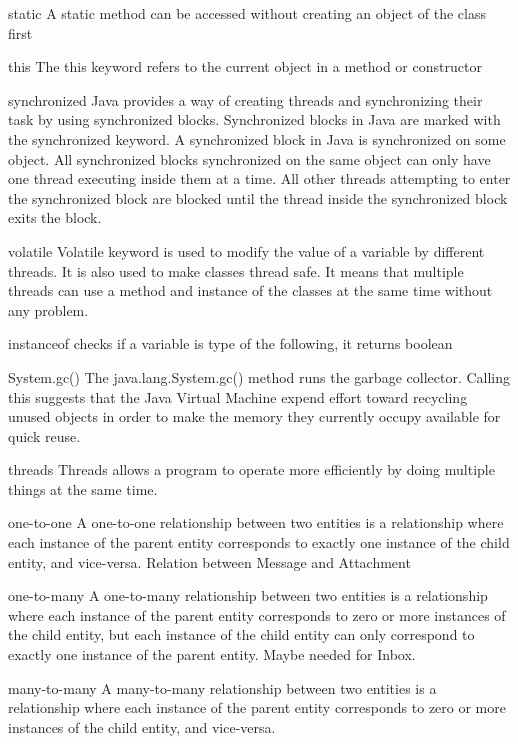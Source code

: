 \documentclass[a4paper,12pt]{article}
\begin{document}
static
A static method can be accessed without creating an object of the class first

this
The this keyword refers to the current object in a method or constructor

synchronized
Java provides a way of creating threads and synchronizing their task by using synchronized blocks. Synchronized blocks in Java are marked with the synchronized keyword. 
A synchronized block in Java is synchronized on some object. 
All synchronized blocks synchronized on the same object can only have one thread executing inside them at a time.
All other threads attempting to enter the synchronized block are blocked until the thread inside the synchronized block exits the block.

volatile
Volatile keyword is used to modify the value of a variable by different threads. It is also used to make classes thread safe. 
It means that multiple threads can use a method and instance of the classes at the same time without any problem.

instanceof
checks if a variable is type of the following, it returns boolean

System.gc()
The java.lang.System.gc() method runs the garbage collector. 
Calling this suggests that the Java Virtual Machine expend effort 
toward recycling unused objects in order to make the memory they currently occupy available for quick reuse.

threads
Threads allows a program to operate more efficiently by doing multiple things at the same time.

one-to-one 
A one-to-one relationship between two entities is a relationship where each instance of the parent entity corresponds to exactly one instance of the child entity, and vice-versa.
Relation between Message and Attachment


one-to-many
A one-to-many relationship between two entities is a relationship where each instance of the parent entity corresponds to zero or more instances of the child entity, 
but each instance of the child entity can only correspond to exactly one instance of the parent entity.
Maybe needed for Inbox. 


many-to-many
A many-to-many relationship between two entities is a relationship where each instance of the parent entity corresponds to zero or more instances of the child entity, and vice-versa.
\end{document}
